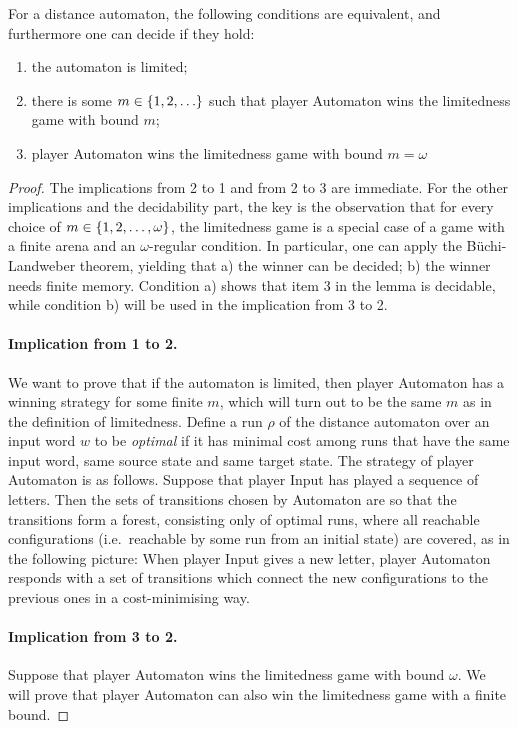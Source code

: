 \begin{lemma}\label{lem:limitedness}
	For a distance automaton, the following conditions are equivalent, and furthermore one can decide if they hold:
	\begin{enumerate}
		\item the automaton is limited;
\item there is some $m \in \{1,2,\ldots\}$ such that player Automaton wins the limitedness game with bound $m$;
\item player Automaton wins the limitedness game with bound $m=\omega$
	\end{enumerate}
\end{lemma}
\begin{proof}
The implications from 2 to 1 and from 2 to 3 are immediate. For the other implications and the decidability part, the key is the observation that for every choice of $m \in  \{1,2,\ldots,\omega\}$,  the limitedness game is a special case of a game with a finite arena and an $\omega$-regular condition.  In particular, one can apply the Büchi-Landweber theorem, yielding that a) the winner can be decided; b) the winner needs finite memory. Condition a) shows that  item 3  in the lemma is decidable, while condition b) will be used in the implication from 3 to 2.

\paragraph*{Implication from 1 to 2.}
We want to prove that if the automaton is limited, then player Automaton has a winning strategy for some finite $m$, which will turn out to be the same $m$ as in the definition of limitedness. Define a run $\rho$ of the distance automaton over an input word $w$ to be \emph{optimal} if it has minimal cost among runs that have the same input word, same source state and same target state. The strategy of player Automaton is as follows.
Suppose that player Input has played a sequence of letters. Then the sets of transitions chosen by Automaton are so that the transitions form a forest, consisting only of optimal runs, where all reachable configurations (i.e.~reachable by some run from an initial state) are covered, as in the following picture:
When player Input gives a new letter, player Automaton responds with a set of transitions which connect the new configurations to the previous ones in a cost-minimising way.

\paragraph*{Implication from 3 to 2.}
Suppose that player Automaton wins the limitedness game with bound $\omega$. We will prove that player Automaton can also win the limitedness game with a finite bound.


\end{proof}
